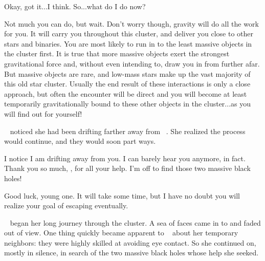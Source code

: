 \documentclass[main.tex]{subfiles}
\begin{document}
\newpara \Sterope Okay, got it...I think.  So...what do I do now?

\newpara \Enrico Not much you can do, but wait.  Don't worry though, gravity will do all the work for you.  It will carry you throughout this cluster, and deliver you close to other stars and binaries.  You are most likely to run in to the least massive objects in the cluster first. It is true that more massive objects exert the strongest gravitational force and, without even intending to, draw you in from further afar.  But massive objects are rare, and low-mass stars make up the vast majority of this old star cluster.  Usually the end result of these interactions is only a close approach, but often the encounter will be direct and you will become at least temporarily gravitationally bound to these other objects in the cluster...as you will find out for yourself!  

\newpara \nar \rmsterope~ noticed she had been drifting farther away from \rmenrico~.  She realized the process would continue, and they would soon part ways.

\newpara \Sterope I notice I am drifting away from you.  I can barely hear you anymore, in fact.  Thank you so much, \rmenrico, for all your help.  I'm off to find those two massive black holes!

\newpara \Enrico Good luck, young one.  It will take some time, but I have no doubt you will realize your goal of escaping eventually.

\newpara \nar \rmsterope~ began her long journey through the cluster.  A sea of faces came in to and faded out of view.  One thing quickly became apparent to \rmsterope~ about her temporary neighbors:  they were highly skilled at avoiding eye contact.  So she continued on, mostly in silence, in search of the two massive black holes whose help she seeked.
\end{document}
